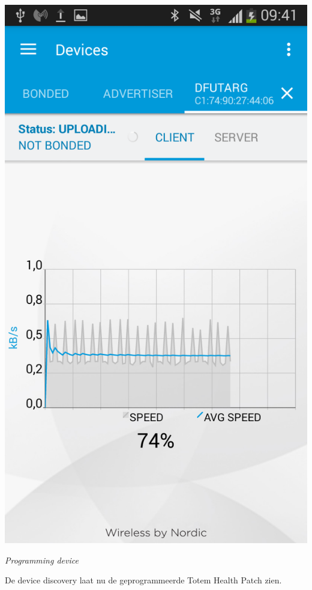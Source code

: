 \documentclass[conference]{IEEEtran}
\begin{document}
\begin{center}
    \includegraphics[scale=0.3]{FOTA9}
    \begin{minipage}{0.6\textwidth}
    \footnotesize
    \emph{Programming device}
    \end{minipage}
\end{center}
\newpage
De device discovery laat nu de geprogrammeerde Totem Health Patch zien.
\end{document}
